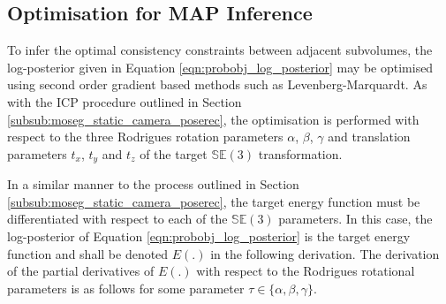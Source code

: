\subsection{Optimisation for MAP Inference}
\label{subsec:probobj_map_optimisation}
To infer the optimal consistency constraints between adjacent subvolumes, the
log-posterior given in Equation \ref{eqn:probobj_log_posterior} may be optimised
using second order gradient based methods such as Levenberg-Marquardt. As with
the ICP procedure outlined in Section \ref{subsub:moseg_static_camera_poserec},
the optimisation is performed with respect to the three Rodrigues rotation
parameters $\alpha$, $\beta$, $\gamma$ and translation parameters $t_{x}$,
$t_{y}$ and $t_{z}$ of the target $\mathbb{SE}(3)$ transformation.

In a similar manner to the process outlined in Section
\ref{subsub:moseg_static_camera_poserec}, the target energy function must be
differentiated with respect to each of the $\mathbb{SE}(3)$ parameters. In this
case, the log-posterior of Equation \ref{eqn:probobj_log_posterior} is the
target energy function and shall be denoted $E(.)$ in the following derivation.
The derivation of the partial derivatives of $E(.)$ with respect
to the Rodrigues rotational parameters is as follows for some parameter
$\tau \in \{\alpha, \beta, \gamma\}$.
